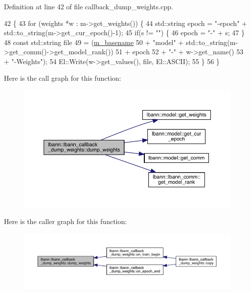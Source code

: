 Definition at line 42 of file callback\+\_\+dump\+\_\+weights.\+cpp.


\begin{DoxyCode}
42                                                                     \{
43   \textcolor{keywordflow}{for} (weights *w : m->get\_weights()) \{
44     std::string epoch = \textcolor{stringliteral}{"-epoch"} + std::to\_string(m->get\_cur\_epoch()-1);
45     \textcolor{keywordflow}{if}(s != \textcolor{stringliteral}{""}) \{
46       epoch = \textcolor{stringliteral}{"-"} + s;
47     \}
48     \textcolor{keyword}{const} std::string file
49       = (\hyperlink{classlbann_1_1lbann__callback__dump__weights_a6c73416bd2edd414e7c4094a19ae2d79}{m\_basename}
50          + \textcolor{stringliteral}{"model"} + std::to\_string(m->get\_comm()->get\_model\_rank())
51          + epoch
52          + \textcolor{stringliteral}{"-"} + w->get\_name()
53          + \textcolor{stringliteral}{"-Weights"});
54     El::Write(w->get\_values(), file, El::ASCII);
55   \}
56 \}
\end{DoxyCode}
Here is the call graph for this function\+:\nopagebreak
\begin{figure}[H]
\begin{center}
\leavevmode
\includegraphics[width=350pt]{classlbann_1_1lbann__callback__dump__weights_a5902fb87255b410a5d777ea385813416_cgraph}
\end{center}
\end{figure}
Here is the caller graph for this function\+:\nopagebreak
\begin{figure}[H]
\begin{center}
\leavevmode
\includegraphics[width=350pt]{classlbann_1_1lbann__callback__dump__weights_a5902fb87255b410a5d777ea385813416_icgraph}
\end{center}
\end{figure}
\mbox{\label{classlbann_1_1lbann__callback__dump__weights_ae6c0fee627651edaff778b1fd4b0e0c4}} 
